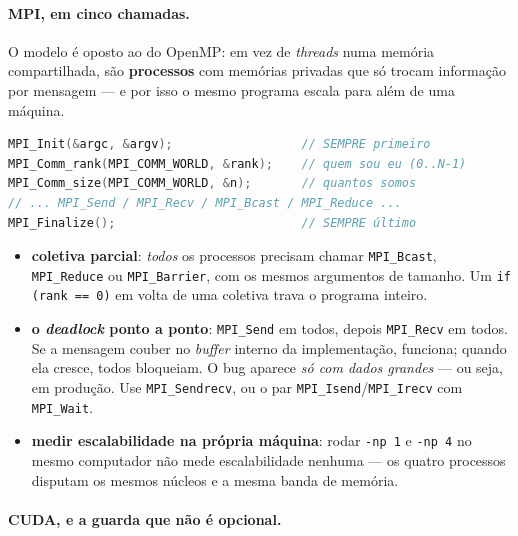 \paragraph{MPI, em cinco chamadas.} O modelo é oposto ao do OpenMP: em vez de
\emph{threads} numa memória compartilhada, são \textbf{processos} com memórias
privadas que só trocam informação por mensagem --- e por isso o mesmo programa
escala para além de uma máquina.

\begin{lstlisting}[style=bt, language=C++,
    caption={O esqueleto obrigatório de todo programa MPI.}]
MPI_Init(&argc, &argv);                  // SEMPRE primeiro
MPI_Comm_rank(MPI_COMM_WORLD, &rank);    // quem sou eu (0..N-1)
MPI_Comm_size(MPI_COMM_WORLD, &n);       // quantos somos
// ... MPI_Send / MPI_Recv / MPI_Bcast / MPI_Reduce ...
MPI_Finalize();                          // SEMPRE último
\end{lstlisting}

\begin{armadilha}
\begin{itemize}
    \item \textbf{coletiva parcial}: \emph{todos} os processos precisam chamar
          \texttt{MPI\_Bcast}, \texttt{MPI\_Reduce} ou \texttt{MPI\_Barrier},
          com os mesmos argumentos de tamanho. Um \texttt{if (rank == 0)} em
          volta de uma coletiva trava o programa inteiro.
    \item \textbf{o \emph{deadlock} ponto a ponto}: \texttt{MPI\_Send} em todos,
          depois \texttt{MPI\_Recv} em todos. Se a mensagem couber no
          \emph{buffer} interno da implementação, funciona; quando ela cresce,
          todos bloqueiam. O bug aparece \emph{só com dados grandes} --- ou
          seja, em produção. Use \texttt{MPI\_Sendrecv}, ou o par
          \texttt{MPI\_Isend}/\texttt{MPI\_Irecv} com \texttt{MPI\_Wait}.
    \item \textbf{medir escalabilidade na própria máquina}: rodar
          \texttt{-np 1} e \texttt{-np 4} no mesmo computador não mede
          escalabilidade nenhuma --- os quatro processos disputam os mesmos
          núcleos e a mesma banda de memória.
\end{itemize}
\end{armadilha}

\paragraph{CUDA, e a guarda que não é opcional.}

